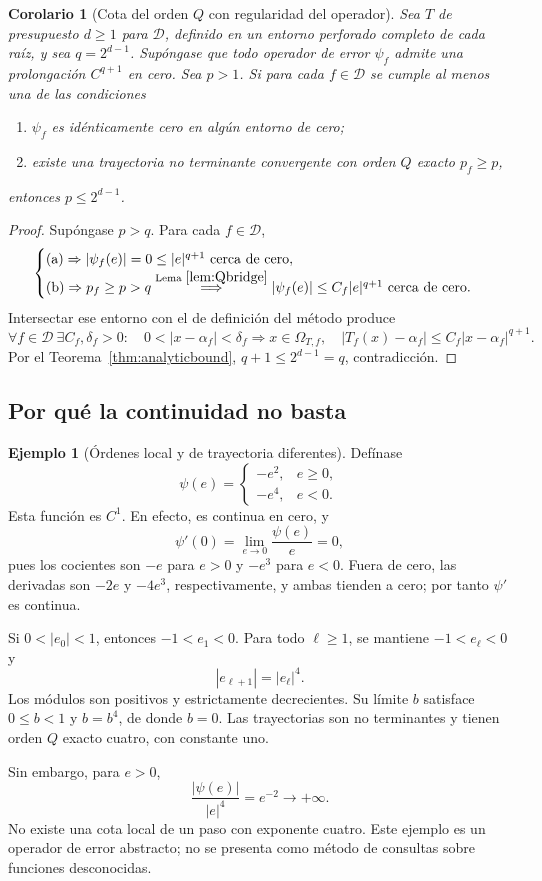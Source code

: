 \documentclass[11pt,a4paper]{article}
\numberwithin{equation}{section}
\newtheorem{corollary}[theorem]{Corolario}
\theoremstyle{definition}
\newtheorem{example}[theorem]{Ejemplo}
\theoremstyle{remark}
\newcommand{\DD}{\mathcal D}
\begin{document}
\begin{corollary}[Cota del orden $Q$ con regularidad del operador]\label{cor:Qbound}
Sea $T$ de presupuesto $d\ge1$ para $\DD$, definido en un entorno perforado completo de cada raíz, y sea $q=2^{d-1}$. Supóngase que todo operador de error $\psi_f$ admite una prolongación $C^{q+1}$ en cero. Sea $p>1$. Si para cada $f\in\DD$ se cumple al menos una de las condiciones
\begin{enumerate}[label=(\alph*)]
\item $\psi_f$ es idénticamente cero en algún entorno de cero;
\item existe una trayectoria no terminante convergente con orden $Q$ exacto $p_f\ge p$,
\end{enumerate}
entonces $p\le2^{d-1}$.
\end{corollary}
\begin{proof}
Supóngase $p>q$. Para cada $f\in\DD$,
\[
\begin{cases}
\text{(a)}\Rightarrow |\psi_f(e)|=0\le|e|^{q+1}\text{ cerca de cero},\\
\text{(b)}\Rightarrow p_f\ge p>q
\overset{\text{Lema }\ref{lem:Qbridge}}{\Longrightarrow}
|\psi_f(e)|\le C_f|e|^{q+1}\text{ cerca de cero}.
\end{cases}
\]
Intersectar ese entorno con el de definición del método produce
\[
\forall f\in\DD\ \exists C_f,\delta_f>0:\quad
0<|x-\alpha_f|<\delta_f\Longrightarrow
x\in\Omega_{T,f},\quad |T_f(x)-\alpha_f|\le C_f|x-\alpha_f|^{q+1}.
\]
Por el Teorema~\ref{thm:analyticbound}, $q+1\le2^{d-1}=q$, contradicción.
\end{proof}

\subsection{Por qué la continuidad no basta}
\begin{example}[Órdenes local y de trayectoria diferentes]\label{ex:orders}
Defínase
\[
\psi(e)=\begin{cases}-e^2,&e\ge0,\\-e^4,&e<0.\end{cases}
\]
Esta función es $C^1$. En efecto, es continua en cero, y
\[
\psi'(0)=\lim_{e\to0}\frac{\psi(e)}e=0,
\]
pues los cocientes son $-e$ para $e>0$ y $-e^3$ para $e<0$. Fuera de cero, las derivadas son $-2e$ y $-4e^3$, respectivamente, y ambas tienden a cero; por tanto $\psi'$ es continua.

Si $0<|e_0|<1$, entonces $-1<e_1<0$. Para todo $\ell\ge1$, se mantiene $-1<e_\ell<0$ y
\[
|e_{\ell+1}|=|e_\ell|^4.
\]
Los módulos son positivos y estrictamente decrecientes. Su límite $b$ satisface $0\le b<1$ y $b=b^4$, de donde $b=0$. Las trayectorias son no terminantes y tienen orden $Q$ exacto cuatro, con constante uno.

Sin embargo, para $e>0$,
\[
\frac{|\psi(e)|}{|e|^4}=e^{-2}\longrightarrow+\infty.
\]
No existe una cota local de un paso con exponente cuatro. Este ejemplo es un operador de error abstracto; no se presenta como método de consultas sobre funciones desconocidas.
\end{example}
\end{document}
